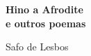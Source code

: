 




\begingroup\thispagestyle{empty}\vspace*{.05\textheight} 

              \formular
              \Huge
              \noindent
              \textbf{Hino a Afrodite\\ e outros poemas}
              
              {\brabo\LARGE
              \noindent Safo de Lesbos}
                    
\endgroup
\vfill
\pagebreak
